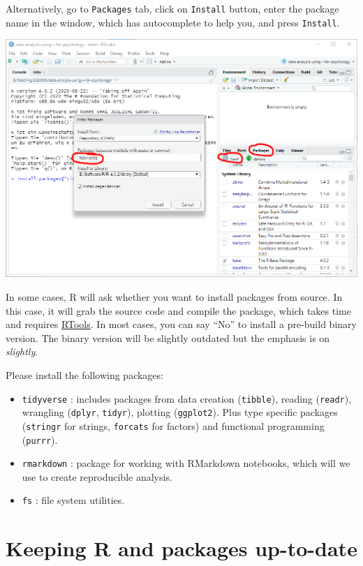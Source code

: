 \documentclass[
]{book}
\providecommand{\tightlist}{%
  \setlength{\itemsep}{0pt}\setlength{\parskip}{0pt}}
\begin{document}
Alternatively, go to \texttt{Packages} tab, click on \texttt{Install} button, enter the package name in the window, which has autocomplete to help you, and press \texttt{Install}.

\begin{center}\includegraphics[width=1\linewidth]{images/install-packages-gui} \end{center}

In some cases, R will ask whether you want to install packages from source. In this case, it will grab the source code and compile the package, which takes time and requires \protect\hyperlink{rtools}{RTools}. In most cases, you can say ``No'' to install a pre-build binary version. The binary version will be slightly outdated but the emphasis is on \emph{slightly}.

Please install the following packages:

\begin{itemize}
\tightlist
\item
  \texttt{tidyverse} : includes packages from data creation (\texttt{tibble}), reading (\texttt{readr}), wrangling (\texttt{dplyr}, \texttt{tidyr}), plotting (\texttt{ggplot2}). Plus type specific packages (\texttt{stringr} for strings, \texttt{forcats} for factors) and functional programming (\texttt{purrr}).
\item
  \texttt{rmarkdown} : package for working with RMarkdown notebooks, which will we use to create reproducible analysis.
\item
  \texttt{fs} : file system utilities.
\end{itemize}

\hypertarget{keeping-r-and-packages-up-to-date}{%
\section*{Keeping R and packages up-to-date}\label{keeping-r-and-packages-up-to-date}}
\end{document}
